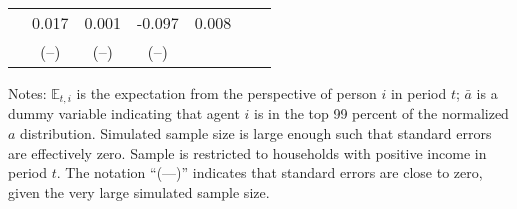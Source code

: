 \begin{table}[t]
\begin{center}
{\begin{tabular}{cd{4}d{4}d{5}ccc}
\\ &  0.017  &    0.001    &     -0.097   & 0.008 &    
\\ &  &   &    &  &   %
\\ \bottomrule  
\end{tabular}  
}\usebox{\crosssecond} 
\settowidth{\TableWidth}{\usebox{\crosssecond}} %
\medskip\medskip \parbox{\TableWidth}{\small Notes: $\mathbb{E}_{t,i}$ is the expectation from the perspective of person $i$ in period $t$; $\bar{a}$ is a dummy variable indicating that agent $i$ is in the top 99 percent of the normalized $a$ distribution.  Simulated sample size is large enough such that standard errors are effectively zero.  Sample is restricted to households with positive income in period $t$. The notation ``(---)'' indicates that standard errors are close to zero, given the very large simulated sample size.}  
\end{center} 
\end{table} 
